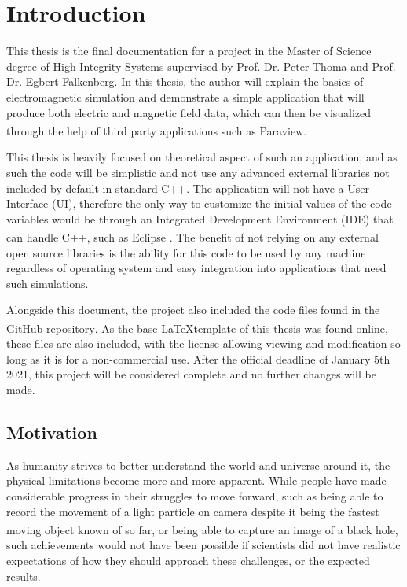 
\chapter{Introduction} %

\label{Chapter1} %

This thesis is the final documentation for a project in the Master of Science degree of High Integrity Systems supervised by Prof. Dr. Peter Thoma and Prof. Dr. Egbert Falkenberg. In this thesis, the author will explain the basics of electromagnetic simulation and demonstrate a simple application that will produce both electric and magnetic field data, which can then be visualized through the help of third party applications such as Paraview\textsuperscript{\cite{paraview}}. 

This thesis is heavily focused on theoretical aspect of such an application, and as such the code will be simplistic and not use any advanced external libraries not included by default in standard C++. The application will not have a User Interface (UI), therefore the only way to customize the initial values of the code variables would be through an Integrated Development Environment (IDE) that can handle C++, such as Eclipse \textsuperscript{\cite{eclipse}}. The benefit of not relying on any external open source libraries is the ability for this code to be used by any machine regardless of operating system and easy integration into applications that need such simulations.

Alongside this document, the project also included the code files found in the GitHub repository\textsuperscript{\cite{robo}}. As the base \LaTeX \space template of this thesis was found online\textsuperscript{\cite{template}}, these files are also included, with the license allowing viewing and modification so long as it is for a non-commercial use. After the official deadline of January 5th 2021, this project will be considered complete and no further changes will be made.

\section{Motivation}

As humanity strives to better understand the world and universe around it, the physical limitations become more and more apparent. While people have made considerable progress in their struggles to move forward, such as being able to record the movement of a light particle on camera despite it being the fastest moving object known of so far\textsuperscript{\cite{velten2013femto}}, or being able to capture an image of a black hole\textsuperscript{\cite{landau_2019}}, such achievements would not have been possible if scientists did not have realistic expectations of how they should approach these challenges, or the expected results. 

